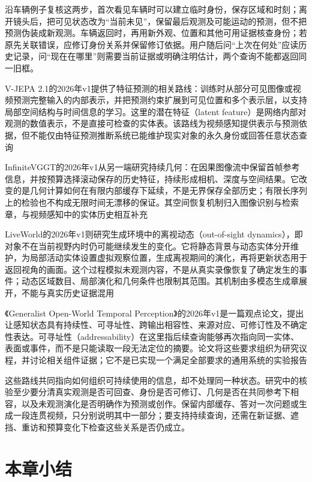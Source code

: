 沿车辆例子复核这两步，首次看见车辆时可以建立临时身份，保存区域和时刻；离开镜头后，把可见状态改为“当前未见”，保留最后观测及可能运动的预测，但不把预测伪装成新观测。车辆返回时，再用新外观、位置和其他可用证据核查身份；若原先关联错误，应修订身份关系并保留修订依据。用户随后问“上次在何处”应读历史记录，问“现在在哪里”则需要当前证据或明确注明估计，两个查询不能都返回同一旧框。

V-JEPA 2.1的2026年v1提供了特征预测的相关路线：训练时从部分可见图像或视频预测完整输入的内部表示，并把预测约束扩展到可见位置和多个表示层，以支持局部空间结构与时间信息的学习。这里的潜在特征（latent feature）是网络内部对观测的数值表示，不是直接可检查的实体表。该路线为视频感知提供表示与预测依据，但不能仅由特征预测推断系统已能维护现实对象的永久身份或回答任意状态查询

InfiniteVGGT的2026年v1从另一端研究持续几何：在因果图像流中保留首帧参考信息，并按预算选择滚动保存的历史特征，持续形成相机、深度与空间结果。它改变的是几何计算如何在有限内部缓存下延续，不是无界保存全部历史；有限长序列上的检验也不构成无限时间无漂移的保证。其空间恢复机制归入图像识别与检索章，与视频感知中的实体历史相互补充

LiveWorld的2026年v1则研究生成环境中的离视动态（out-of-sight dynamics），即对象不在当前视野内时仍可能继续发生的变化。它将静态背景与动态实体分开维护，为局部活动实体设置虚拟观察位置，生成离视期间的演化，再将更新状态用于返回视角的画面。这个过程模拟未观测内容，不是从真实录像恢复了确定发生的事件；动态区域数目、局部演化和几何条件也限制其范围。其机制由多模态生成章展开，不能与真实历史证据混用

《Generalist Open-World Temporal Perception》的2026年v1是一篇观点论文，提出让感知状态具有持续性、可寻址性、跨输出相容性、来源对应、可修订性及不确定性表达。可寻址性（addressability）在这里指后续查询能够再次指向同一实体、表面或事件，而不是只能读取一段无法定位的摘要。论文将这些要求组织为研究议程，并讨论相关组件证据；它不是已实现一个满足全部要求的通用系统的实验报告

这些路线共同指向如何组织可持续使用的信息，却不处理同一种状态。研究中的核验至少要分清真实观测是否可回查、身份是否可修订、几何是否在共同参考下相容，以及未观测演化是否明确作为预测或创作。保留内部缓存、答对一次问题或生成一段连贯视频，只分别说明其中一部分；要支持持续查询，还需在新证据、遮挡、重访和预算变化下检查这些关系是否仍成立。

\section{本章小结}
\label{sec:vision-overview-summary}

